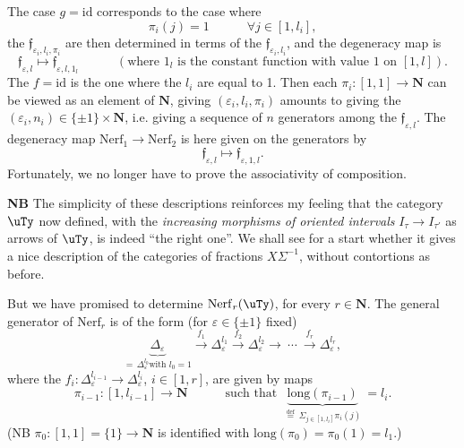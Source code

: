 The case $g=\mathrm{id}$ corresponds to the case where
\[
\pi_i(j)=1 \qquad\quad \forall j\in[1,l_i],
\]
the $\mathfrak{f}_{\varepsilon_i,l_i,\pi_i}$ are then determined in terms of the $\mathfrak{f}_{\varepsilon_i,l_i}$, and the degeneracy map is %
\[
\mathfrak{f}_{\varepsilon,l}\longmapsto\mathfrak{f}_{\varepsilon,l,1_l} \qquad\quad (\text{where } 1_l \text{ is the constant function with value 1 on } [1,l]).
\]
The $f=\mathrm{id}$ is the one where the $l_i$ are equal to 1. Then each $\pi_i : [1,1]\longrightarrow\mathbf{N}$ can be viewed as an element of $\mathbf{N}$, giving $(\varepsilon_i,l_i,\pi_i)$ amounts to giving the $(\varepsilon_i,n_i)\in\{\pm1\}\times\mathbf{N}$, i.e. giving %
a sequence of $n$ generators among the $\mathfrak{f}_{\varepsilon,l}$. The degeneracy map $\mathrm{Nerf}_1\longrightarrow\mathrm{Nerf}_2$ is here given on the generators by
\[
\mathfrak{f}_{\varepsilon,l}\longmapsto\mathfrak{f}_{\varepsilon,1,l}.
\]
Fortunately, we no longer have to prove the associativity of composition.

\textbf{NB} The simplicity of these descriptions reinforces my feeling that the category $\uTy$ now defined, with the \textit{increasing morphisms of oriented intervals} $I_\tau\longrightarrow I_{\tau'}$ as arrows of $\uTy$, is indeed ``the right one''. We shall see for a start whether it gives a nice description of the categories of fractions $X\Sigma^{-1}$, without contortions as before.

But we have promised to determine $\mathrm{Nerf}_r(\uTy)$, for every $r\in\mathbf{N}$. The general generator of $\mathrm{Nerf}_r$ is of the form (for $\varepsilon\in\{\pm1\}$ fixed)
\[
\underbrace{\Delta_\varepsilon}_{=\,\Delta^{l_0}_\varepsilon\text{with } l_0=1}\xrightarrow{\ f_1\ }\Delta^{l_1}_\varepsilon\xrightarrow{\ f_2\ }\Delta^{l_2}_\varepsilon\longrightarrow\ \cdots\ \xrightarrow{\ f_r\ }\Delta^{l_r}_\varepsilon,
\]
where the $f_i : \Delta^{l_{i-1}}_\varepsilon\longrightarrow\Delta^{l_i}_\varepsilon$, $i\in[1,r]$, are given by maps
\[
\pi_{i-1} : [1,l_{i-1}]\longrightarrow\mathbf{N} \qquad\quad \text{such that }\ \underbrace{\mathrm{long}(\pi_{i-1})}_{\overset{\text{def}}{=}\ \Sigma_{j\in[1,l_i]}\pi_i(j)}\ = l_i. %
\]
(NB $\pi_0 : [1,1]=\{1\}\longrightarrow\mathbf{N}$ is identified with $\mathrm{long}(\pi_0)=\pi_0(1)=l_1$.)

